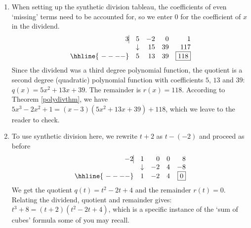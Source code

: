 \documentclass{ximera}
\begin{document}
\begin{exampleSol}
    \begin{enumerate}
        \item When setting up the synthetic division tableau, the coefficients of even `missing' terms need to be accounted for, so we enter $0$ for the coefficient of $x$ in the dividend.  
            \[ 
            \begin{array}{rrrrr}
                3   \vline& 5 & -2 & 0  & 1 \\
                & \downarrow &  15  &  39  & 117 \\ \hhline{~----} 
                & 5  &   13  & 39  &  \fbox{$118$}  \\  
            \end{array}
            \]
            Since the dividend was a third degree polynomial function, the quotient is a second degree (quadratic) polynomial function with coefficients $5$, $13$ and $39$:   $q(x) = 5x^2+13x+39$. The remainder is $r(x) = 118$.  According to Theorem \ref{polydivthm}, we have $5x^3 - 2x^2 + 1 = (x-3)\left(5x^2+13x+39 \right) + 118$, which we leave to the reader to check.
        
        \item  To use synthetic division here, we rewrite $t+2$ as $t-(-2)$ and proceed as before
            \[ 
                \begin{array}{rrrrr}
                    -2   \vline& 1 & 0 & 0  & 8 \\
                    & \downarrow &  -2  &  4  & -8 \\ \hhline{~----} 
                    & 1  &   -2  & 4  &  \fbox{$0$}  \\  
                \end{array}
            \]
            We get the quotient $q(t) = t^2-2t+4$ and the remainder $r(t) =0$. Relating the dividend, quotient and remainder gives: $t^3+8 = (t+2)\left( t^2-2t+4 \right)$, which is a specific instance of the `sum of cubes' formula some of you may recall.  
        

\end{enumerate}
\end{exampleSol}
\end{document}
